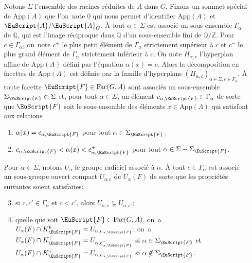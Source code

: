 \documentclass[JEP,XML,SOM,Unicode,francais]{cedram}
\let\mathcal \EuScript
\newcommand{\App}{\mathrm{App}}
\newcommand{\Fac}{\mathrm{Fac}}
\newcommand{\cA}{\mathcal{A}}
\newcommand{\cF}{\mathcal{F}}
\newcommand{\ZZ}{\mathbb{Z}}
\newcommand{\QQ}{\mathbb{Q}}
\theoremstyle{plain}
\theoremstyle{definition}
\begin{document}
Notons $\Sigma$ l'ensemble des racines réduites de $A$ dans $G$. Fixons un sommet spécial de $\App(A)$ que l'on~note $0$ qui nous permet d'identifier $\App(A)$ et $\cA/\cA_{G}$. À tout $\alpha\in \Sigma$ est associé un sous-ensemble $\Gamma_{\alpha}$ de $\QQ$, qui est l'image réciproque dans $\QQ$ d'un sous-ensemble fini de $\QQ/\ZZ$. Pour $c\in \Gamma_{\alpha}$, on~note $c^+$ le plus petit élément de $\Gamma_{\alpha}$ strictement supérieur à $c$ et $c^-$ le plus grand élément de $\Gamma_{\alpha}$ strictement inférieur à $c$. On note $H_{\alpha,c}$ l'hyperplan affine de $\App(A)$ défini par l'équation $\alpha(x)=c$. Alors la décomposition en facettes de $\App(A)$ est définie par la famille d'hyperplans $(H_{\alpha,c})_{\alpha\in \Sigma, c\in \Gamma_{\alpha}}$. À toute facette $\cF\in \Fac(G,A)$ sont associés un sous-ensemble $\Sigma_{\cF}\subset \Sigma$ et, pour tout $\alpha\in \Sigma$, un élément $c_{\alpha,\cF}\in \Gamma_{\alpha}$ de sorte que $\cF$ soit le sous-ensemble des éléments $x\in \App(A)$ qui satisfont aux relations
\begin{enumerate}
\item\label{description1}
$\alpha(x)=c_{\alpha,\cF}$ pour tout $\alpha\in \Sigma_{\cF}$;

\item\label{description2}
$c_{\alpha,\cF}<\alpha(x)<c_{\alpha,\cF}^+$ pour tout $\alpha\in \Sigma-\Sigma_{\cF}$.
\end{enumerate}

Pour $\alpha\in \Sigma$, notons $U_{\alpha}$ le groupe radiciel associé à $\alpha$. À tout $c\in \Gamma_{\alpha}$ est associé un sous-groupe ouvert compact $U_{\alpha,c}$ de $U_{\alpha}(F)$ de sorte que les propriétés suivantes soient satisfaites:

\begin{enumerate}\setcounter{enumi}{2}
\item\label{description3}
si $c,c'\in \Gamma_{\alpha}$ et $c<c'$, alors $U_{\alpha,c}\subsetneq U_{\alpha,c'}$;

\item\label{description4}
quelle que soit $\cF\in \Fac(G,A)$, on~a $U_{\alpha}(F)\cap K_{\cF}^0=U_{\alpha,c_{\alpha,\cF}}$; on~a $U_{\alpha}(F)\cap K_{\cF}^+=U_{\alpha,c_{\alpha,\cF}^-}$ si $\alpha\in \Sigma_{\cF}$ et $U_{\alpha}(F)\cap K_{\cF}^+=U_{\alpha,c_{\alpha,\cF}}$ si $\alpha\not \in \Sigma_{\cF}$.
\end{enumerate}
\end{document}
